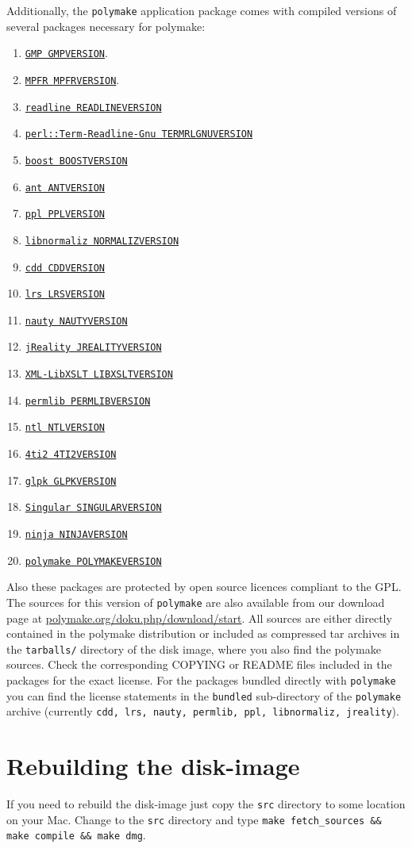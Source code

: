 \documentclass[a4paper]{amsart}
\newcommand{\polymake}{\texttt{polymake}\xspace}
\begin{document}
Additionally, the \polymake application package comes with compiled versions of several packages necessary for polymake: 
\begin{enumerate}
\item \href{GMPHOME}{\texttt{GMP GMPVERSION}}.
\item \href{MPFRHOME}{\texttt{MPFR MPFRVERSION}}.
\item \href{READLINEHOME}{\texttt{readline READLINEVERSION}}
\item \href{TERMRLGNUHOME}{\texttt{perl::Term-Readline-Gnu TERMRLGNUVERSION}}
\item \href{BOOSTHOME}{\texttt{boost BOOSTVERSION}}
\item \href{ANTHOME}{\texttt{ant ANTVERSION}}
\item \href{PPLHOME}{\texttt{ppl PPLVERSION}}
\item \href{NORMALIZHOME}{\texttt{libnormaliz NORMALIZVERSION}}
\item \href{CDDHOME}{\texttt{cdd CDDVERSION}}
\item \href{LRSHOME}{\texttt{lrs LRSVERSION}}
\item \href{NAUTYHOME}{\texttt{nauty NAUTYVERSION}}
\item \href{JREALITYHOME}{\texttt{jReality JREALITYVERSION}}
\item \href{LIBXSLTHOME}{\texttt{XML-LibXSLT LIBXSLTVERSION}}
\item \href{PERMLIBHOME}{\texttt{permlib PERMLIBVERSION}}
\item \href{NTLHOME}{\texttt{ntl NTLVERSION}}
\item \href{4TI2HOME}{\texttt{4ti2 4TI2VERSION}}
\item \href{GLPKHOME}{\texttt{glpk GLPKVERSION}}
\item \href{SINGULARHOME}{\texttt{Singular SINGULARVERSION}}
\item \href{NINJAHOME}{\texttt{ninja NINJAVERSION}}
\item \href{POLYMAKEHOME}{\texttt{polymake POLYMAKEVERSION}}
\end{enumerate}
Also these packages are protected by open source licences compliant to the GPL. The sources for this version of \polymake are also available from our download page at \href{http://polymake.org/doku.php/download/start}{polymake.org/doku.php/download/start}. All sources are either directly contained in the polymake distribution or included as compressed tar archives in the \texttt{tarballs/} directory of the disk image, where you also find the polymake sources. Check the corresponding COPYING or README files included in the packages for the exact license.  For the packages bundled directly with \polymake you can find the license statements in the \texttt{bundled} sub-directory of the \polymake archive (currently \texttt{cdd, lrs, nauty, permlib, ppl, libnormaliz, jreality}).

\section*{Rebuilding the disk-image}

If you need to rebuild the disk-image just copy the \texttt{src} directory to some location on your Mac. Change to the \texttt{src} directory and type \texttt{make fetch\_sources \&\& make compile \&\& make dmg}.
\end{document}
